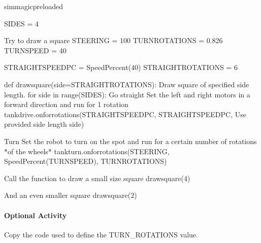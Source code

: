 \documentclass[letterpaper,10pt,english]{sphinxmanual}
\begin{document}
{
\begin{sphinxVerbatim}[commandchars=\\\{\}]
\llap{\color{nbsphinxin}[ ]:\,\hspace{\fboxrule}\hspace{\fboxsep}}\PYGZpc{}\PYGZpc{}sim\PYGZus{}magic\PYGZus{}preloaded

SIDES = 4

\PYGZsh{} Try to draw a square
STEERING = \PYGZhy{}100
TURN\PYGZus{}ROTATIONS = 0.826
TURN\PYGZus{}SPEED = 40

STRAIGHT\PYGZus{}SPEED\PYGZus{}PC = SpeedPercent(40)
STRAIGHT\PYGZus{}ROTATIONS = 6

def draw\PYGZus{}square(side=STRAIGHT\PYGZus{}ROTATIONS):
    \PYGZdq{}\PYGZdq{}\PYGZdq{}Draw square of specified side length.\PYGZdq{}\PYGZdq{}\PYGZdq{}
    for side in range(SIDES):
        \PYGZsh{}Go straight
        \PYGZsh{} Set the left and right motors in a forward direction
        \PYGZsh{} and run for 1 rotation
        tank\PYGZus{}drive.on\PYGZus{}for\PYGZus{}rotations(STRAIGHT\PYGZus{}SPEED\PYGZus{}PC,
                                    STRAIGHT\PYGZus{}SPEED\PYGZus{}PC,
                                    \PYGZsh{}Use provided side length
                                    side)

        \PYGZsh{}Turn
        \PYGZsh{} Set the robot to turn on the spot
        \PYGZsh{} and run for a certain number of rotations *of the wheels*
        tank\PYGZus{}turn.on\PYGZus{}for\PYGZus{}rotations(STEERING,
                                   SpeedPercent(TURN\PYGZus{}SPEED),
                                   TURN\PYGZus{}ROTATIONS)


\PYGZsh{} Call the function to draw a small size square
draw\PYGZus{}square(4)

\PYGZsh{} And an even smaller square
draw\PYGZus{}square(2)
\end{sphinxVerbatim}
}


\paragraph{Optional Activity}
\label{\detokenize{content/03_Robot_Lab/Section_00_05:Optional-Activity}}
Copy the code used to define the TURN\_ROTATIONS\textasciigrave{} value.
\end{document}
